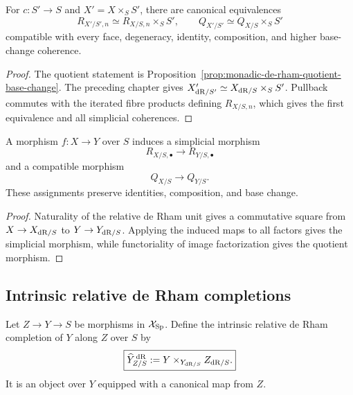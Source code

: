 \begin{theorem}
\label{thm:modal-nerve-base-change}
For \(c:S'\to S\) and \(X'=X\times_SS'\), there are canonical equivalences
\[
\boxed{
    R_{X'/S',n}\simeq R_{X/S,n}\times_SS',
    \qquad
    Q_{X'/S'}\simeq Q_{X/S}\times_SS'
}
\]
compatible with every face, degeneracy, identity, composition, and higher base-change coherence.
\end{theorem}

\begin{proof}
The quotient statement is Proposition~\ref{prop:monadic-de-rham-quotient-base-change}.  The
preceding chapter gives
\(X'_{\mathrm{dR}/S'}\simeq X_{\mathrm{dR}/S}\times_SS'\).  Pullback commutes with the iterated fibre products
defining \(R_{X/S,n}\), which gives the first equivalence and all simplicial coherences.
\end{proof}

\begin{proposition}
\label{prop:modal-nerve-functoriality}
A morphism \(f:X\to Y\) over \(S\) induces a simplicial morphism
\[
    R_{X/S,\bullet}\longrightarrow R_{Y/S,\bullet}
\]
and a compatible morphism
\[
    Q_{X/S}\longrightarrow Q_{Y/S}.
\]
These assignments preserve identities, composition, and base change.
\end{proposition}

\begin{proof}
Naturality of the relative de Rham unit gives a commutative square from
\(X\to X_{\mathrm{dR}/S}\) to \(Y\to Y_{\mathrm{dR}/S}\).  Applying the induced maps to all factors gives the
simplicial morphism, while functoriality of image factorization gives the quotient morphism.
\end{proof}


\subsection{Intrinsic relative de Rham completions}
\label{subsec:monadic-de-rham-completion}

\begin{definition}
\label{def:intrinsic-relative-dr-completion}
Let \(Z\to Y\to S\) be morphisms in \(\mathcal X_{\mathrm{Sp}}\).  Define the intrinsic relative de Rham
completion of \(Y\) along \(Z\) over \(S\) by
\[
\boxed{
    \widehat Y^{\,\mathrm{dR}}_{Z/S}
    :=
    Y\times_{Y_{\mathrm{dR}/S}}Z_{\mathrm{dR}/S}.
}
\]
It is an object over \(Y\) equipped with a canonical map from \(Z\).
\end{definition}

